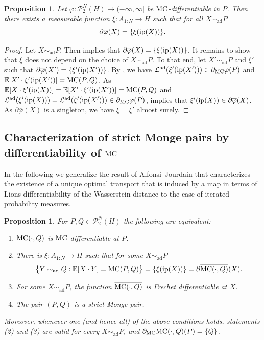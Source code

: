 \documentclass[a4paper]{amsart}
\numberwithin{theorem}{section}
\newtheorem{proposition}[theorem]{Proposition}
\theoremstyle{definition}
\newcommand{\E}{\mathbb{E}}
\newcommand{\law}{\mathcal{L}}
\newcommand{\Pc}{\mathcal P}
\newcommand{\simad}{\sim_{\mathrm{ad}}}
\renewcommand{\H}{H}
\renewcommand{\phi}{\varphi}
\newcommand{\mc}{\textup{MC}}
\newcommand{\MC}{\textup{MC}}
\newcommand{\ip}{\textup{ip}}
\newcommand{\lawad}{\law^{\textup{ad}}}
\begin{document}
\begin{proposition}\label{prop:LdiffXi_ad}
Let $\phi:\Pc_2^N(\H)\to (-\infty, \infty]$ be $\MC$-differentiable in $P$. Then there exists  a measurable function  $\xi : A_{1:N} \to \H$ such that for all $X\simad P$ 
\[
\partial\overline{\phi}(X) = \{\xi( \ip(X) )\}.
\]
\end{proposition}
\begin{proof}
Let $X \simad P$. Then  implies that $\partial\overline{\phi}(X) = \{\xi( \ip(X) )\}$. It remains to show that $\xi$ does not depend on the choice of $X \simad P$. To that end, let $X'  \simad P$ and $\xi'$ such that  $\partial\overline{\phi}(X') = \{\xi'( \ip(X') )\}$. By , we have $\lawad(\xi'(\ip(X'))) \in \partial_\mc \phi(P)$ and $\E[ X' \cdot \xi'(\ip(X')) ] = \mc(P,Q)$. As $\E[ X \cdot \xi'(\ip(X))]= \E[ X' \cdot \xi'(\ip(X')) ] = \mc(P,Q) $ and $\lawad(\xi'(\ip(X))) = \lawad(\xi'(\ip(X'))) \in \partial_\mc\phi(P)$,   implies that $\xi'(\ip(X)) \in \partial\overline{\phi}(X)$. As $\partial\overline{\phi}(X)$ is a singleton, we have $\xi = \xi'$ almost surely.
\end{proof}

\subsection{Characterization of strict Monge pairs by differentiability of $\mc$}
In the following we generalize the result of Alfonsi--Jourdain \cite{AlJo20} that characterizes the existence of a unique optimal transport that is induced by a map in terms of Lions differentiability of the Wasserstein distance to the case of iterated probability measures. 



\begin{proposition}\label{prop:AJ_adapted}
    For $P,Q \in \Pc_2^N(\H)$ the following are equivalent:
    \begin{enumerate}
        \item $\mc(\cdot,Q)$ is $\mc$-differentiable at $P$.
        \item There is $\xi : A_{1:N} \to \H $ such that for some $X \simad P$
        \[
            \big\{ Y \simad Q : \E[X \cdot Y] = \MC(P,Q) \big\} = \{ \xi(\ip(X)) \} = \partial \overline{\mc(\cdot,Q)}(X).
        \]
        \item For some $X \simad P$, the function $\overline{\mc(\cdot,Q)}$ is Frechet differentiable at $X$.
        \item The pair $(P,Q)$ is a strict Monge pair.
    \end{enumerate}
    Moreover, whenever one (and hence all) of the above conditions holds, statements (2) and (3) are valid for every $X \simad P$, and $\partial_\mc \mc(\cdot,Q)(P) = \{ Q \}$.
\end{proposition}
\end{document}
